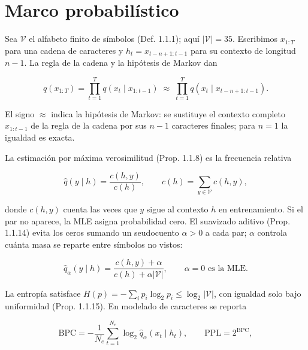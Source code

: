\documentclass[11pt,letterpaper]{article}
\begin{document}
	\section{Marco probabilístico}
	
	Sea $\mathcal V$ el alfabeto finito de símbolos (Def. 1.1.1); aquí $|\mathcal V|=35$. Escribimos $x_{1:T}$ para una cadena de caracteres y $h_t=x_{t-n+1:t-1}$ para su contexto de longitud $n-1$. La regla de la cadena y la hipótesis de Markov dan
	

	\begin{equation}
		q(x_{1:T})=\prod_{t=1}^{T}q(x_t\mid x_{1:t-1})
		\;\approx\;\prod_{t=1}^{T}q(x_t\mid x_{t-n+1:t-1}). \tag{1}
	\end{equation}
	
	El signo $\approx$ indica la hipótesis de Markov: se sustituye el contexto completo $x_{1:t-1}$ de la regla de la cadena por sus $n-1$ caracteres finales; para $n=1$ la igualdad es exacta.
	
	La estimación por máxima verosimilitud (Prop. 1.1.8) es la frecuencia relativa
	
	\begin{equation}
		\hat q(y\mid h)=\frac{c(h,y)}{c(h)},\qquad c(h)=\sum_{y\in\mathcal V}c(h,y),
	\end{equation}
	
	donde $c(h,y)$ cuenta las veces que $y$ sigue al contexto $h$ en entrenamiento. Si el par no aparece, la MLE asigna probabilidad cero. El suavizado aditivo (Prop. 1.1.14) evita los ceros sumando un seudocuento $\alpha>0$ a cada par; $\alpha$ controla cuánta masa se reparte entre símbolos no vistos:
	
	\begin{equation}
		\hat q_\alpha(y\mid h)=\frac{c(h,y)+\alpha}{c(h)+\alpha|\mathcal V|},
		\qquad \alpha=0 \text{ es la MLE}. \tag{2}
	\end{equation}
	
	La entropía satisface $H(p)=-\sum_i p_i\log_2 p_i\le\log_2|\mathcal V|$, con igualdad solo bajo uniformidad (Prop. 1.1.15). En modelado de caracteres se reporta

	\begin{equation}
		\mathrm{BPC}=-\frac{1}{N_e}\sum_{t=1}^{N_e}\log_2\hat q_\alpha(x_t\mid h_t),
		\qquad \mathrm{PPL}=2^{\mathrm{BPC}}, \tag{3}
	\end{equation}
	
\end{document}
